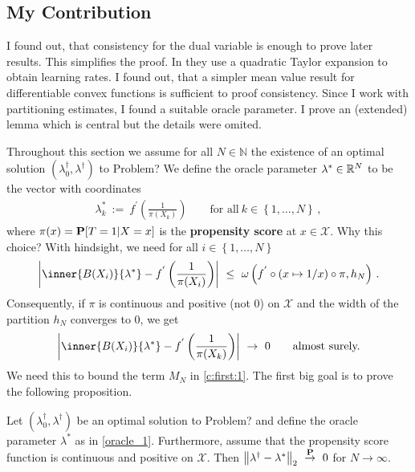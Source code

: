 \subsection*{My Contribution}
I found out, that consistency for the dual variable is enough to prove later results. This simplifies the proof. 
In \cite{Wang2019} they use a quadratic Taylor expansion to obtain learning rates. I found out, that a simpler mean value result for differentiable convex functions is sufficient to proof consistency. 
Since I work with partitioning estimates, I found a suitable oracle parameter.
I prove an (extended) lemma which is central but the details were omited.

Throughout this section we assume for all $N\in\mathbb{N}$ the existence of an 
optimal solution 
$(\lambda_0^\dagger,\lambda^\dagger)$
to Problem?
We define the oracle parameter $\lambda^*\in\R^N$ to be the vector with coordinates
\begin{gather}
  \label{oracle_1}
  \lambda^*_k
  \ 
  :=
  \ 
  f^{'}
  \left( 
    \frac{1}{\pi(X_k)}
  \right)
  \qquad
  \text{for all}\ 
  k\in \left\{ 1,\ldots,N \right\}
  \,,
\end{gather}
where $\pi(x)=\P[T=1|X=x]$ is the \textbf{propensity score} at $x\in\mathcal{X}$. Why this choice? 
With hindsight, we need
for all $i\in \left\{ 1,\ldots,N \right\}$
\begin{gather}
\left| 
\inner{B(X_i)}
{\lambda^*}
  -
  f^{'}
  \left( 
    \frac{1}{\pi(X_i)}
  \right)
\right|
\ 
\le
\ 
      \omega
      \left( f^{'}\circ (x\mapsto1/x)\circ \pi,h_N \right)
      \,.
\end{gather}
Consequently, if $\pi$ is continuous and positive (not 0) on $\mathcal{X}$ and the width of the partition $h_N$ converges to 0, we get 
\begin{gather}
 \left| 
  \inner{B(X_i)}{\lambda^*}
  -
  f^{'}
  \left( 
    \frac{1}{\pi(X_k)}
  \right)
 \right| 
 \
 \to
 \ 
 0
 \qquad
 \text{almost surely.}
\end{gather}
We need this to bound the term $M_N$ in \eqref{c:first:1}.
The first big goal is to prove the following proposition.
\begin{proposition}
  \label{bw:cd:th}
  Let 
$(\lambda_0^\dagger,\lambda^\dagger)$
be an optimal solution 
to Problem?
and define the oracle parameter $\lambda^*$ as in \eqref{oracle_1}.
Furthermore, assume that the propensity score function is continuous and positive on $\mathcal{X}$.
Then 
$
    \norm{
      \lambda^\dagger
      -
      \lambda^*
    }_2
    \ 
    \overset{\P}{\to}
    \ 
    0
$
for $N\to\infty$.
\end{proposition}

